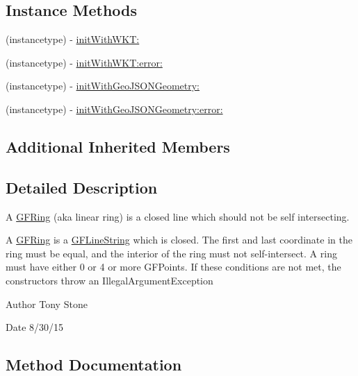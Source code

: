 \subsection*{Instance Methods}
\begin{DoxyCompactItemize}
\item 
(instancetype) -\/ \hyperlink{interface_g_f_ring_a063be826fc24346e1fb5d4830f641ef0}{init\+With\+W\+K\+T\+:}
\item 
(instancetype) -\/ \hyperlink{interface_g_f_ring_a22ccba4abea45feba6cbc9e6078bb465}{init\+With\+W\+K\+T\+:error\+:}
\item 
(instancetype) -\/ \hyperlink{interface_g_f_ring_a3562a7a5b8b37c53de97a0c31981c907}{init\+With\+Geo\+J\+S\+O\+N\+Geometry\+:}
\item 
(instancetype) -\/ \hyperlink{interface_g_f_ring_a99cfb5fc3ca21698e9714e55c9bc394a}{init\+With\+Geo\+J\+S\+O\+N\+Geometry\+:error\+:}
\end{DoxyCompactItemize}
\subsection*{Additional Inherited Members}


\subsection{Detailed Description}
A \hyperlink{interface_g_f_ring}{G\+F\+Ring} (aka linear ring) is a closed line which should not be self intersecting. 

A \hyperlink{interface_g_f_ring}{G\+F\+Ring} is a \hyperlink{interface_g_f_line_string}{G\+F\+Line\+String} which is closed. The first and last coordinate in the ring must be equal, and the interior of the ring must not self-\/intersect. A ring must have either 0 or 4 or more G\+F\+Points. If these conditions are not met, the constructors throw an Illegal\+Argument\+Exception

\begin{DoxyAuthor}{Author}
Tony Stone 
\end{DoxyAuthor}
\begin{DoxyDate}{Date}
8/30/15 
\end{DoxyDate}


\subsection{Method Documentation}
\hypertarget{interface_g_f_ring_a063be826fc24346e1fb5d4830f641ef0}{}
